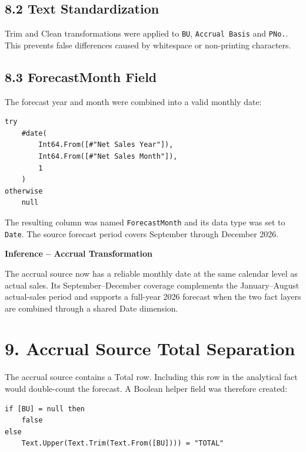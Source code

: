 \documentclass[11pt,a4paper]{article}
\begin{document}
\subsection{8.2 Text Standardization}

Trim and Clean transformations were applied to \texttt{BU},
\texttt{Accrual Basis} and \texttt{PNo.}. This prevents false differences
caused by whitespace or non-printing characters.

\subsection{8.3 ForecastMonth Field}

The forecast year and month were combined into a valid monthly date:

\begin{lstlisting}[style=powerquery]
try
    #date(
        Int64.From([#"Net Sales Year"]),
        Int64.From([#"Net Sales Month"]),
        1
    )
otherwise
    null
\end{lstlisting}

The resulting column was named \texttt{ForecastMonth} and its data type
was set to \texttt{Date}. The source forecast period covers September
through December 2026.

\begin{inferencebox}

\textbf{Inference -- Accrual Transformation}

The accrual source now has a reliable monthly date at the same calendar level
as actual sales. Its September--December coverage complements the
January--August actual-sales period and supports a full-year 2026 forecast when
the two fact layers are combined through a shared Date dimension.

\end{inferencebox}


\section{9. Accrual Source Total Separation}

The accrual source contains a Total row. Including this row in the
analytical fact would double-count the forecast. A Boolean helper field
was therefore created:

\begin{lstlisting}[style=powerquery]
if [BU] = null then
    false
else
    Text.Upper(Text.Trim(Text.From([BU]))) = "TOTAL"
\end{lstlisting}
\end{document}
